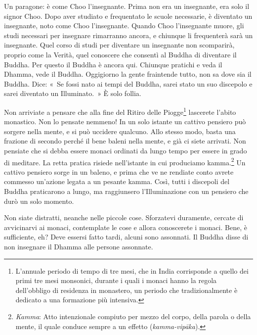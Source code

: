 Un paragone: è come Choo l'insegnante. Prima non era un insegnante, era
solo il signor Choo. Dopo aver studiato e frequentato le scuole
necessarie, è diventato un insegnante, noto come Choo l'insegnante.
Quando Choo l'insegnante muore, gli studi necessari per insegnare
rimarranno ancora, e chiunque li frequenterà sarà un insegnante. Quel
corso di studi per diventare un insegnante non scomparirà, proprio come
la Verità, quel conoscere che consentì al Buddha di diventare il Buddha.
Per questo il Buddha è ancora qui. Chiunque pratichi e veda il Dhamma,
vede il Buddha. Oggigiorno la gente fraintende tutto, non sa dove sia il
Buddha. Dice: «~Se fossi nato ai tempi del Buddha, sarei stato un suo
discepolo e sarei diventato un Illuminato.~» È solo follia.

Non arriviate a pensare che alla fine del Ritiro delle Piogge\footnote{L'annuale
  periodo di tempo di tre mesi, che in India corrisponde a quello dei
  primi tre mesi monsonici, durante i quali i monaci hanno la regola
  dell'obbligo di residenza in monastero, un periodo che
  tradizionalmente è dedicato a una formazione più intensiva.} lascerete
l'abito monastico. Non lo pensate nemmeno! In un solo istante un cattivo
pensiero può sorgere nella mente, e si può uccidere qualcuno. Allo
stesso modo, basta una frazione di secondo perché il bene baleni nella
mente, e già ci siete arrivati. Non pensiate che si debba essere monaci
ordinati da lungo tempo per essere in grado di meditare. La retta
pratica risiede nell'istante in cui produciamo kamma.\footnote{%
  \emph{Kamma}:
  Atto intenzionale compiuto per mezzo del corpo, della parola o della
  mente, il quale conduce sempre a un effetto (\emph{kamma-vipāka}).}
Un cattivo pensiero sorge in un baleno, e prima che ve ne rendiate conto
avrete commesso un'azione legata a un pesante kamma. Così, tutti
i discepoli del Buddha praticarono a lungo, ma raggiunsero
l'Illuminazione con un pensiero che durò un solo momento.

Non siate distratti, neanche nelle piccole cose. Sforzatevi duramente,
cercate di avvicinarvi ai monaci, contemplate le cose e allora
conoscerete i monaci. Bene, è sufficiente, eh? Deve essersi fatto tardi,
alcuni sono assonnati. Il Buddha disse di non insegnare il Dhamma alle
persone assonnate.

